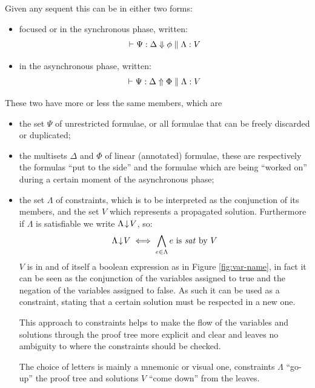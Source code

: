 \documentclass[a4paper, 12pt, tesi, english]{report}
\begin{document}
\begin{define}
	Given any sequent this can be in either two forms:
	\begin{itemize}
		\item focused or in the synchronous phase, written:
			$$\vdash \Psi : \Delta \Downarrow \phi \;\Vert\; \Lambda : V$$
		\item in the asynchronous phase, written:
			$$\vdash \Psi : \Delta \Uparrow \Phi \;\Vert\; \Lambda : V$$
	\end{itemize}
	These two have more or less the same members, which are
	\begin{itemize}
		\item the set $\Psi$ of unrestricted formulae, or all formulae that can be freely discarded or duplicated;
		\item the multisets $\Delta$ and $\Phi$ of linear (annotated) formulae, these are respectively the formulas ``put to the side'' and the formulae which are being ``worked on'' during a certain moment of the asynchronous phase;
		\item the set $\Lambda$ of constraints, which is to be interpreted as the conjunction of its members, and the set $V$ which represents a propagated solution.
			Furthermore if $\Lambda$ is satisfiable we write $\Lambda\!\downarrow\!V$, so:
				$$ \Lambda\!\downarrow\!V \;\Longleftrightarrow\; \bigwedge_{e \in \Lambda} e \text{ is \textit{sat} by } V $$
			$V$ is in and of itself a boolean expression as in Figure \ref{fig:var-name}, in fact it can be seen as the conjunction of the variables assigned to true and the negation of the variables assigned to false.
			As such it can be used as a constraint, stating that a certain solution must be respected in a new one.
			
			This approach to constraints helps to make the flow of the variables and solutions through the proof tree more explicit and clear and leaves no ambiguity to where the constraints should be checked.

			The choice of letters is mainly a mnemonic or visual one, constraints $\Lambda$ ``go-up'' the proof tree and solutions $V$ ``come down'' from the leaves.
	\end{itemize}
\end{define}
\end{document}
